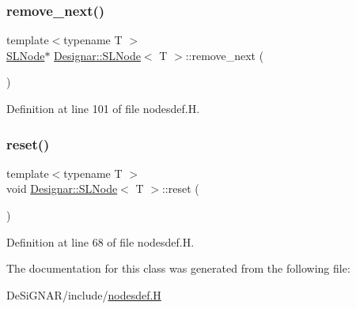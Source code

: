 \mbox{\label{class_designar_1_1_s_l_node_aa12ebd41228f87e9df06d5e74b7111e6}} 
\subsubsection{\texorpdfstring{remove\+\_\+next()}{remove\_next()}}
{\footnotesize\ttfamily template$<$typename T $>$ \\
\hyperlink{class_designar_1_1_s_l_node}{S\+L\+Node}$\ast$ \hyperlink{class_designar_1_1_s_l_node}{Designar\+::\+S\+L\+Node}$<$ T $>$\+::remove\+\_\+next (\begin{DoxyParamCaption}{ }\end{DoxyParamCaption})\hspace{0.3cm}{\ttfamily [inline]}}



Definition at line 101 of file nodesdef.\+H.

\mbox{\label{class_designar_1_1_s_l_node_ad837fcbb2d5d1fb1c7aa51392f6fdaae}} 
\subsubsection{\texorpdfstring{reset()}{reset()}}
{\footnotesize\ttfamily template$<$typename T $>$ \\
void \hyperlink{class_designar_1_1_s_l_node}{Designar\+::\+S\+L\+Node}$<$ T $>$\+::reset (\begin{DoxyParamCaption}{ }\end{DoxyParamCaption})\hspace{0.3cm}{\ttfamily [inline]}}



Definition at line 68 of file nodesdef.\+H.



The documentation for this class was generated from the following file\+:\begin{DoxyCompactItemize}
\item 
De\+Si\+G\+N\+A\+R/include/\hyperlink{nodesdef_8_h}{nodesdef.\+H}\end{DoxyCompactItemize}
